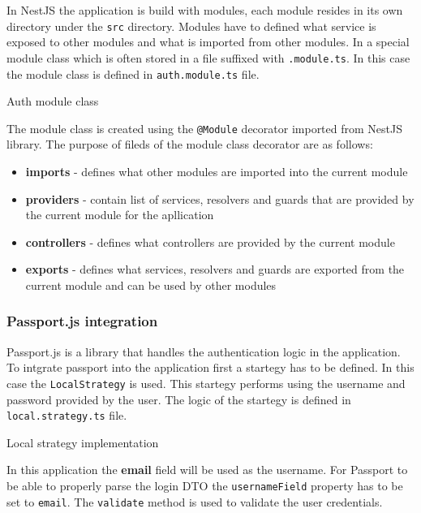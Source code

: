 \documentclass[../main.tex]{subfiles}
\begin{document}
In NestJS the application is build with modules, each module resides in its own directory under the \texttt{src} directory.
Modules have to defined what service is exposed to other modules and what is imported from other modules. In a special module class
which is often stored in a file suffixed with \texttt{.module.ts}. In this case the module class is defined in \texttt{auth.module.ts} file.

\begin{listing}[H]
  \caption{Auth module class}
  \label{lst:auth-module}
\end{listing}

The module class is created using the \texttt{@Module} decorator imported from NestJS library.
The purpose of fileds of the module class decorator are as follows:
\begin{itemize}
  \item \textbf{imports} - defines what other modules are imported into the current module
  \item \textbf{providers} - contain list of services, resolvers and guards that are provided by the current module for the apllication
  \item \textbf{controllers} - defines what controllers are provided by the current module
  \item \textbf{exports} - defines what services, resolvers and guards are exported from the current module and can be used by other modules
\end{itemize}

\subsubsection{Passport.js integration}

Passport.js is a library that handles the authentication logic in the application.
To intgrate passport into the application first a startegy has to be defined. In this case the \texttt{LocalStrategy} is used.
This startegy performs using the username and password provided by the user. The logic of the startegy is defined in \texttt{local.strategy.ts} file.

\begin{listing}[H]
  \caption{Local strategy implementation}
\end{listing}

In this application the \textbf{email} field will be used as the username. For Passport to be able to properly parse the login DTO the
\texttt{usernameField} property has to be set to \texttt{email}. The \texttt{validate} method is used to validate the user credentials.
\end{document}
